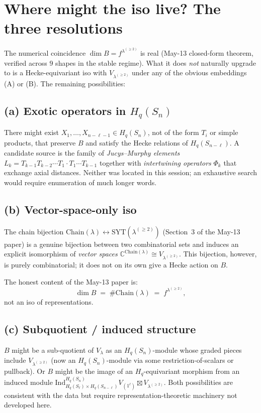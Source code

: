 \documentclass[11pt]{article}
\theoremstyle{definition}
\begin{document}
\section{Where might the iso live? The three resolutions}\label{sec:resolutions}

The numerical coincidence $\dim B = f^{\lambda^{(\ge 2)}}$ is real (May-13
closed-form theorem, verified across $9$ shapes in the stable regime).
What it does \emph{not} naturally upgrade to is a Hecke-equivariant iso
with $V_{\lambda^{(\ge 2)}}$ under any of the obvious embeddings (A) or
(B). The remaining possibilities:

\subsection*{(a) Exotic operators in $H_q(S_n)$}
There might exist $X_1, \ldots, X_{n-\ell-1} \in H_q(S_n)$, not of the
form $T_i$ or simple products, that preserve $B$ and satisfy the
Hecke relations of $H_q(S_{n-\ell})$. A candidate source is the family
of \emph{Jucys--Murphy elements}
$L_k = T_{k-1}T_{k-2}\cdots T_1 \cdot T_1 \cdots T_{k-1}$ together with
\emph{intertwining operators} $\Phi_{k}$ that exchange axial distances.
Neither was located in this session; an exhaustive search would
require enumeration of much longer words.

\subsection*{(b) Vector-space-only iso}
The chain bijection $\mathrm{Chain}(\lambda) \leftrightarrow
\mathrm{SYT}(\lambda^{(\ge 2)})$ (Section~3 of the May-13 paper) is a
genuine bijection between two combinatorial sets and induces an
explicit isomorphism of \emph{vector spaces}
$\mathbb{C}^{\mathrm{Chain}(\lambda)} \cong V_{\lambda^{(\ge 2)}}$.
This bijection, however, is purely combinatorial; it does not on its
own give a Hecke action on $B$.

The honest content of the May-13 paper is:
\[
   \dim B \;=\; \#\mathrm{Chain}(\lambda) \;=\; f^{\lambda^{(\ge 2)}},
\]
not an iso of representations.

\subsection*{(c) Subquotient / induced structure}
$B$ might be a sub-quotient of $V_\lambda$ as an $H_q(S_n)$-module
whose graded pieces include $V_{\lambda^{(\ge 2)}}$ (now an
$H_q(S_n)$-module via some restriction-of-scalars or pullback). Or
$B$ might be the image of an $H_q$-equivariant morphism from an
induced module $\mathrm{Ind}_{H_q(S_\ell) \times H_q(S_{n-\ell})}^{H_q(S_n)}
V_{(1^\ell)} \boxtimes V_{\lambda^{(\ge 2)}}$. Both possibilities are
consistent with the data but require representation-theoretic
machinery not developed here.
\end{document}
